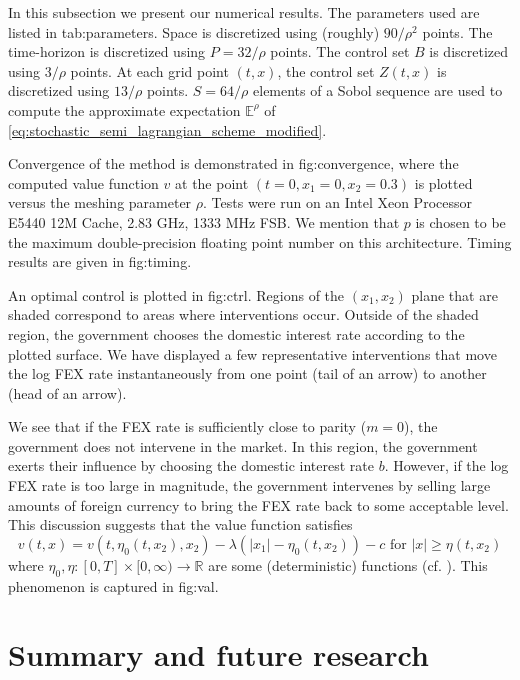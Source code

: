 \documentclass[12pt]{article}
\begin{document}
In this subsection we present our numerical results. The parameters
used are listed in {\prettyref}{tab:parameters}. Space is discretized
using (roughly) $90/\rho^{2}$ points. The time-horizon is discretized
using $P=32/\rho$ points. The control set $B$ is discretized using
$3/\rho$ points. At each grid point $(t,x)$, the control set $Z(t,x)$
is discretized using $13/\rho$ points. $S=64/\rho$ elements of a
Sobol sequence are used to compute the approximate expectation $\mathbb{E}^{\rho}$
of \eqref{eq:stochastic_semi_lagrangian_scheme_modified}.

Convergence of the method is demonstrated in {\prettyref}{fig:convergence},
where the computed value function $v$ at the point $(t=0,x_{1}=0,x_{2}=0.3)$
is plotted versus the meshing parameter $\rho$. Tests were run on
an Intel Xeon Processor E5440 12M Cache, 2.83 GHz, 1333 MHz FSB.
We mention that $p$ is chosen to be the maximum double-precision
floating point number on this architecture. Timing
results are given in {\prettyref}{fig:timing}.

An optimal control is plotted in {\prettyref}{fig:ctrl}. Regions of
the $(x_{1},x_{2})$ plane that are shaded correspond to areas where
interventions occur. Outside of the shaded region, the government
chooses the domestic interest rate according to the plotted surface.
We have displayed a few representative interventions that move the
log FEX rate instantaneously from one point (tail of an arrow) to
another (head of an arrow).

We see that if the FEX rate is sufficiently close to parity ($m=0$),
the government does not intervene in the market. In this region, the
government exerts their influence by choosing the domestic interest
rate $b$. However, if the log FEX rate is too large in magnitude,
the government intervenes by selling large amounts of foreign currency
to bring the FEX rate back to some acceptable level. This discussion
suggests that the value function satisfies
\[
v(t,x)=v(t,\eta_{0}(t,x_{2}),x_{2})-\lambda\left(\left|x_{1}\right|-\eta_{0}(t,x_{2})\right)-c\text{ for }\left|x\right|{\geqslant}\eta(t,x_{2})
\]
where $\eta_{0},\eta:[0,T]\times[0,\infty)\rightarrow\mathbb{R}$
are some (deterministic) functions (cf. \cite{MR1614233}). This phenomenon
is captured in {\prettyref}{fig:val}.

\section{Summary and future research}
\end{document}
